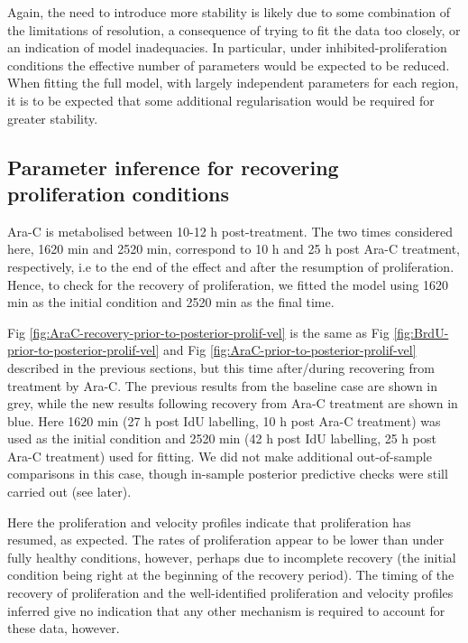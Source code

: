 \documentclass[10pt,letterpaper]{article}
\begin{document}
Again, the need to introduce more stability is likely due to some
combination of the limitations of resolution, a consequence of trying to
fit the data too closely, or an indication of model inadequacies. In
particular, under inhibited-proliferation conditions the effective
number of parameters would be expected to be reduced. When fitting the
full model, with largely independent parameters for each region, it is
to be expected that some additional regularisation would be required for
greater stability.

\subsection{Parameter inference for recovering proliferation
conditions}\label{parameter-inference-for-recovering-proliferation-conditions}

Ara-C is metabolised between 10-12 h post-treatment. The two times
considered here, 1620 min and 2520 min, correspond to 10 h and 25 h post
Ara-C treatment, respectively, i.e to the end of the effect and after
the resumption of proliferation. Hence, to check for the recovery of
proliferation, we fitted the model using 1620 min as the initial
condition and 2520 min as the final time.

Fig \ref{fig:AraC-recovery-prior-to-posterior-prolif-vel} is the same as
Fig \ref{fig:BrdU-prior-to-posterior-prolif-vel} and Fig
\ref{fig:AraC-prior-to-posterior-prolif-vel} described in the previous
sections, but this time after/during recovering from treatment by Ara-C.
The previous results from the baseline case are shown in grey, while the
new results following recovery from Ara-C treatment are shown in blue.
Here 1620 min (27 h post IdU labelling, 10 h post Ara-C treatment) was
used as the initial condition and 2520 min (42 h post IdU labelling, 25
h post Ara-C treatment) used for fitting. We did not make additional
out-of-sample comparisons in this case, though in-sample posterior
predictive checks were still carried out (see later).

Here the proliferation and velocity profiles indicate that proliferation
has resumed, as expected. The rates of proliferation appear to be lower
than under fully healthy conditions, however, perhaps due to incomplete
recovery (the initial condition being right at the beginning of the
recovery period). The timing of the recovery of proliferation and the
well-identified proliferation and velocity profiles inferred give no
indication that any other mechanism is required to account for these
data, however.
\end{document}
